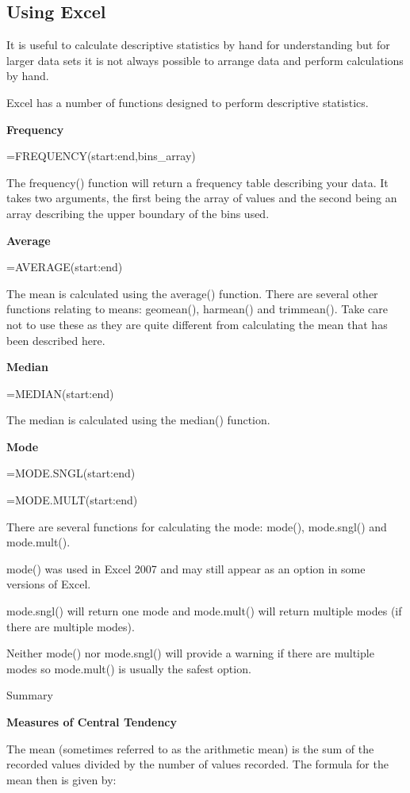 \documentclass[
]{book}
\begin{document}
\hypertarget{using-excel}{%
\subsection{Using Excel}\label{using-excel}}

It is useful to calculate descriptive statistics by hand for understanding but for larger data sets it is not always possible to arrange data and perform calculations by hand.

Excel has a number of functions designed to perform descriptive statistics.

\textbf{Frequency}

=FREQUENCY(start:end,bins\_array)

The frequency() function will return a frequency table describing your data. It takes two arguments, the first being the array of values and the second being an array describing the upper boundary of the bins used.

\textbf{Average}

=AVERAGE(start:end)

The mean is calculated using the average() function. There are several other functions relating to means: geomean(), harmean() and trimmean(). Take care not to use these as they are quite different from calculating the mean that has been described here.

\textbf{Median}

=MEDIAN(start:end)

The median is calculated using the median() function.

\textbf{Mode}

=MODE.SNGL(start:end)

=MODE.MULT(start:end)

There are several functions for calculating the mode: mode(), mode.sngl() and mode.mult().

mode() was used in Excel 2007 and may still appear as an option in some versions of Excel.

mode.sngl() will return one mode and mode.mult() will return multiple modes (if there are multiple modes).

Neither mode() nor mode.sngl() will provide a warning if there are multiple modes so mode.mult() is usually the safest option.

Summary

\textbf{Measures of Central Tendency}

The mean (sometimes referred to as the arithmetic mean) is the sum of the recorded values divided by the number of values recorded. The formula for the mean then is given by:
\end{document}
